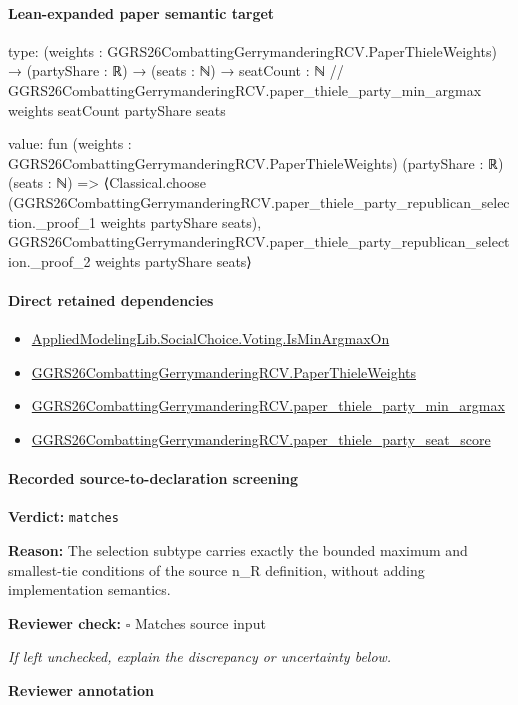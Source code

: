 \documentclass[10pt]{article}
\newcommand{\reviewerbox}{%
  \par\noindent\fbox{\parbox{0.96\linewidth}{\rule{0pt}{0.38in}}}\par
}
\newcommand{\reviewmatch}[1]{%
  \par\noindent\textbf{Reviewer check:} $\square$\; #1\par
  \noindent\emph{If left unchecked, explain the discrepancy or uncertainty below.}\par
}
\begin{document}
\paragraph{Lean-expanded paper semantic target}
\begin{ReviewVerbatim}
type:
(weights : GGRS26CombattingGerrymanderingRCV.PaperThieleWeights) →
  (partyShare : ℝ) →
    (seats : ℕ) →
      { seatCount : ℕ //
        GGRS26CombattingGerrymanderingRCV.paper_thiele_party_min_argmax weights seatCount partyShare seats }

value:
fun (weights : GGRS26CombattingGerrymanderingRCV.PaperThieleWeights) (partyShare : ℝ) (seats : ℕ) =>
  ⟨Classical.choose
      (GGRS26CombattingGerrymanderingRCV.paper_thiele_party_republican_selection._proof_1 weights partyShare seats),
    GGRS26CombattingGerrymanderingRCV.paper_thiele_party_republican_selection._proof_2 weights partyShare seats⟩
\end{ReviewVerbatim}

\paragraph{Direct retained dependencies}
\begin{itemize}\raggedright
\item \hyperlink{governing-declaration-d2947cd1d156937d}{Applied\allowbreak{}Modeling\allowbreak{}Lib.\allowbreak{}Social\allowbreak{}Choice.\allowbreak{}Voting.\allowbreak{}Is\allowbreak{}Min\allowbreak{}Argmax\allowbreak{}On}
\item \hyperlink{paper-prerequisite-37b91baa3b4ddc9d}{GGRS26\allowbreak{}Combatting\allowbreak{}Gerrymandering\allowbreak{}RCV.\allowbreak{}Paper\allowbreak{}Thiele\allowbreak{}Weights}
\item \hyperlink{paper-prerequisite-58801459d14912d4}{GGRS26\allowbreak{}Combatting\allowbreak{}Gerrymandering\allowbreak{}RCV.\allowbreak{}paper\_\allowbreak{}thiele\_\allowbreak{}party\_\allowbreak{}min\_\allowbreak{}argmax}
\item \hyperlink{governing-declaration-d8487ebdee5a1786}{GGRS26\allowbreak{}Combatting\allowbreak{}Gerrymandering\allowbreak{}RCV.\allowbreak{}paper\_\allowbreak{}thiele\_\allowbreak{}party\_\allowbreak{}seat\_\allowbreak{}score}
\end{itemize}
\paragraph{Recorded source-to-declaration screening}
\textbf{Verdict:} \texttt{matches}
\\
{\raggedright
\textbf{Reason:} The selection subtype carries exactly the bounded maximum and smallest-\allowbreak{}tie conditions of the source n\_\allowbreak{}R definition, without adding implementation semantics.\allowbreak{}
\par}
\reviewmatch{Matches source input}
\noindent\textbf{Reviewer annotation}\par
\reviewerbox
\clearpage
\hypertarget{paper-prerequisite-5fa565502cdaaed9}{}
\end{document}
